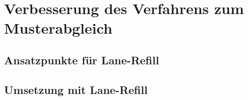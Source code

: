 \chapter{Verbesserung des Verfahrens zum Musterabgleich}

\section{Ansatzpunkte für Lane-Refill}

\section{Umsetzung mit Lane-Refill}
